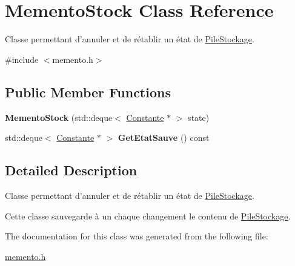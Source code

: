 \hypertarget{class_memento_stock}{\section{Memento\-Stock Class Reference}
\label{class_memento_stock}
}


Classe permettant d'annuler et de rétablir un état de \hyperlink{class_pile_stockage}{Pile\-Stockage}.  




{\ttfamily \#include $<$memento.\-h$>$}

\subsection*{Public Member Functions}
\begin{DoxyCompactItemize}
\item 
\hypertarget{class_memento_stock_a31a9bd8576254b31edc21c885d0f0376}{{\bfseries Memento\-Stock} (std\-::deque$<$ \hyperlink{class_constante}{Constante} $\ast$ $>$ state)}\label{class_memento_stock_a31a9bd8576254b31edc21c885d0f0376}

\item 
\hypertarget{class_memento_stock_a14cee296b4fdf6fc421835d6df568100}{std\-::deque$<$ \hyperlink{class_constante}{Constante} $\ast$ $>$ {\bfseries Get\-Etat\-Sauve} () const }\label{class_memento_stock_a14cee296b4fdf6fc421835d6df568100}

\end{DoxyCompactItemize}


\subsection{Detailed Description}
Classe permettant d'annuler et de rétablir un état de \hyperlink{class_pile_stockage}{Pile\-Stockage}. 

Cette classe sauvegarde à un chaque changement le contenu de \hyperlink{class_pile_stockage}{Pile\-Stockage}. 

The documentation for this class was generated from the following file\-:\begin{DoxyCompactItemize}
\item 
\hyperlink{memento_8h}{memento.\-h}\end{DoxyCompactItemize}
